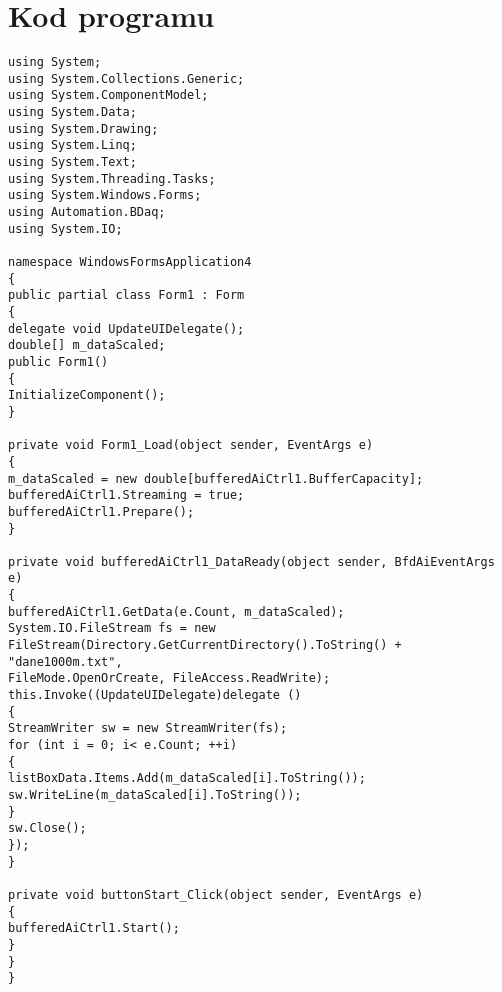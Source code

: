 \documentclass[12pt]{article}
\begin{document}
\section{Kod  programu}
\begin{verbatim}
using System;
using System.Collections.Generic;
using System.ComponentModel;
using System.Data;
using System.Drawing;
using System.Linq;
using System.Text;
using System.Threading.Tasks;
using System.Windows.Forms;
using Automation.BDaq;
using System.IO;

namespace WindowsFormsApplication4
{
public partial class Form1 : Form
{
delegate void UpdateUIDelegate();
double[] m_dataScaled;
public Form1()
{
InitializeComponent();
}

private void Form1_Load(object sender, EventArgs e)
{
m_dataScaled = new double[bufferedAiCtrl1.BufferCapacity];
bufferedAiCtrl1.Streaming = true;
bufferedAiCtrl1.Prepare();
}

private void bufferedAiCtrl1_DataReady(object sender, BfdAiEventArgs e)
{
bufferedAiCtrl1.GetData(e.Count, m_dataScaled);
System.IO.FileStream fs = new FileStream(Directory.GetCurrentDirectory().ToString() + "dane1000m.txt",
FileMode.OpenOrCreate, FileAccess.ReadWrite);
this.Invoke((UpdateUIDelegate)delegate ()
{
StreamWriter sw = new StreamWriter(fs);
for (int i = 0; i< e.Count; ++i)
{
listBoxData.Items.Add(m_dataScaled[i].ToString());
sw.WriteLine(m_dataScaled[i].ToString());
}
sw.Close();
});
}

private void buttonStart_Click(object sender, EventArgs e)
{
bufferedAiCtrl1.Start();
}
}
}

\end{verbatim}
\end{document}
